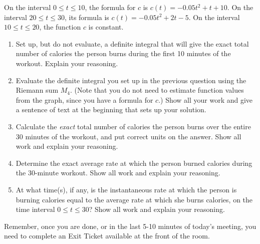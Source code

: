 \documentclass[11pt]{article}
\begin{document}
On the interval $0 \leq t \leq 10$, the formula for $c$ is $c(t) = -0.05t^2 + t + 10$. On the interval $20 \leq t \leq 30$, its formula is $c(t) = -0.05t^2 + 2t - 5$. On the interval $10 \leq t \leq 20$, the function $c$ is constant. 

\begin{enumerate}
	\item Set up, but do not evaluate, a definite integral that will give the exact total number of calories the person burns during the first 10 minutes of the workout. Explain your reasoning. 
	
	\item Evaluate the definite integral you set up in the previous question using the Riemann sum $M_4$. (Note that you do not need to estimate function values from the graph, since you have a formula for $c$.) Show all your work and give a sentence of text at the beginning that sets up your solution. 
	
	\item Calculate the \emph{exact} total number of calories the person burns over the entire 30 minutes of the workout, and put correct units on the answer. Show all work and explain your reasoning. 
	
	\item Determine the exact average rate at which the person burned calories during the 30-minute workout. Show all work and explain your reasoning. 
	
	\item At what time(s), if any, is the instantaneous rate at which the person is burning calories equal to the average rate at which she burns calories, on the time interval $0 \leq t \leq 30$? Show all work and explain your reasoning. 
\end{enumerate}

\bigskip

\begin{center}
Remember, once you are done, or in the last 5-10 minutes of today's meeting, you need to complete an Exit Ticket available at the front of the room. 
\end{center}
\end{document}
